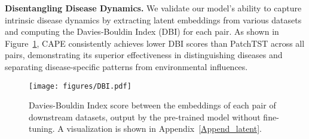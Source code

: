 \noindent\textbf{Disentangling Disease Dynamics.} We validate our model's ability to capture intrinsic disease dynamics by extracting latent embeddings from various datasets and computing the Davies-Bouldin Index (DBI) for each pair. As shown in Figure~\ref{fig: dbi}, CAPE consistently achieves lower DBI scores than PatchTST across all pairs, demonstrating its superior effectiveness in distinguishing diseases and separating disease-specific patterns from environmental influences.
\begin{figure}[htbp]
    \centering
    \texttt{[image: figures/DBI.pdf]}
    \caption{Davies-Bouldin Index score between the embeddings of each pair of downstream datasets, output by the pre-trained model without fine-tuning. A visualization is shown in Appendix~\ref{Append_latent}.}
    \label{fig: dbi}
\end{figure} 












